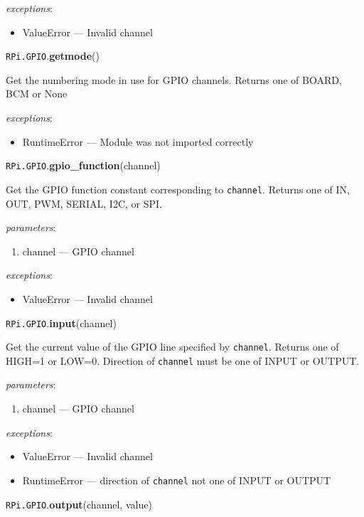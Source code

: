 \documentclass[12pt]{article}
\begin{document}
 
\textit{exceptions}:
\begin{itemize}
    \item ValueError --- Invalid channel
\end{itemize}

\noindent \texttt{RPi.GPIO}.\textbf{getmode}()
    
Get the numbering mode in use for GPIO channels. Returns one of BOARD, BCM or None

\textit{exceptions}:
\begin{itemize}
    \item RuntimeError --- Module was not imported correctly
\end{itemize}


\noindent \texttt{RPi.GPIO}.\textbf{gpio\_function}(channel)
        
Get the GPIO function constant corresponding to \texttt{channel}. Returns one of IN, OUT, PWM, SERIAL, I2C, or SPI.
        
\textit{parameters}:
\begin{enumerate}      
        \item channel --- GPIO channel
\end{enumerate}
 
 
\textit{exceptions}:
\begin{itemize}
    \item ValueError --- Invalid channel
\end{itemize}

\noindent \texttt{RPi.GPIO}.\textbf{input}(channel)
        
Get the current value of the GPIO line specified by \texttt{channel}. Returns one of HIGH=1 or LOW=0. Direction of \texttt{channel} must be one of INPUT or OUTPUT.
        
\textit{parameters}:
\begin{enumerate}      
        \item channel --- GPIO channel
\end{enumerate}
 
 
\textit{exceptions}:
\begin{itemize}
    \item ValueError --- Invalid channel
    \item RuntimeError --- direction of \texttt{channel} not one of INPUT or OUTPUT
\end{itemize}


\noindent \texttt{RPi.GPIO}.\textbf{output}(channel, value)
        
\end{document}
